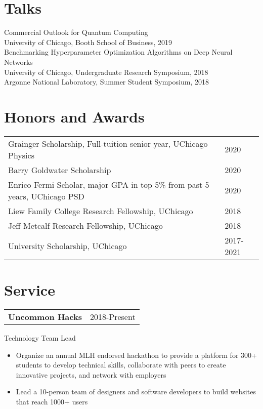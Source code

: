 \documentclass[letterpaper, 12pt]{article}
\begin{document}
\section{Talks}
Commercial Outlook for Quantum Computing\\
\qquad University of Chicago, Booth School of Business, 2019\\
Benchmarking Hyperparameter Optimization Algorithms on Deep Neural Networks\\
\qquad University of Chicago, Undergraduate Research Symposium, 2018\\
\qquad Argonne National Laboratory, Summer Student Symposium, 2018\\

\section{Honors and Awards}
\begin{tabular}{@{} L{14.5cm} @{} R{2.01cm} @{}}
  Grainger Scholarship, Full-tuition senior year, UChicago Physics & 2020\\
  Barry Goldwater Scholarship & 2020\\
  Enrico Fermi Scholar, major GPA in top 5\% from past 5 years, UChicago PSD & 2020\\
  Liew Family College Research Fellowship, UChicago & 2018\\
  Jeff Metcalf Research Fellowship, UChicago & 2018 \\
  University Scholarship, UChicago & 2017-2021\\
\end{tabular}

\section{Service}
\begin{tabular}{@{} L{12cm} @{} R{4.51cm} @{}}
  \textbf{Uncommon Hacks} & 2018-Present\\
\end{tabular}
Technology Team Lead\\
\begin{itemize}
\item Organize an annual MLH endorsed hackathon to provide a platform for 300+
  students to develop technical skills,
  collaborate with peers to create innovative projects, and network with employers
\item Lead a 10-person team of designers and software developers
  to build websites that reach 1000+ users
\end{itemize}
\end{document}
